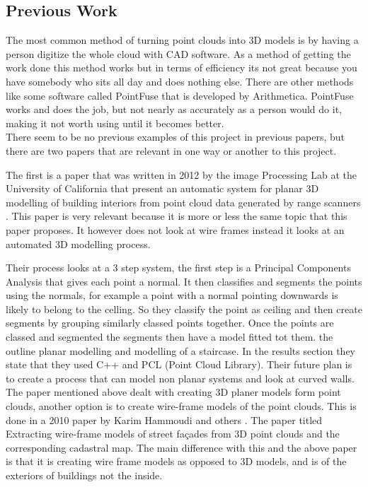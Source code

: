 

\subsection{Previous Work}

	The most common method of turning point clouds into 3D models is by having a person digitize the whole cloud with CAD software. As a method of getting the work done this method works but in terms of efficiency its not great because you have somebody who sits all day and does nothing else. There are other methods like some software called PointFuse that is developed by Arithmetica. PointFuse works and does the job, but not nearly as accurately as a person would do it, making it not worth using until it becomes better.\\

	
	There seem to be no previous examples of this project in previous papers, but there are two papers that are relevant in one way or another to this project.
	
	The first is a paper that was written in 2012 by the image Processing Lab at the University of California that present an automatic system for planar 3D modelling of building interiors from point cloud data generated by range scanners \citep{sanchez_planar_2012}. This paper is very relevant because it is more or less the same topic that this paper proposes. It however does not look at wire frames instead it looks at an automated 3D modelling process.
	
	Their process looks at a 3 step system, the first step is a Principal Components Analysis that gives each point a normal.
	It then classifies and segments the points using the normals, for example a point with a normal pointing downwards is likely to belong to the celling. So they classify the point as ceiling and then create segments by grouping similarly classed points together.
	Once the points are classed and segmented the segments then have a model fitted tot them. the outline planar modelling and modelling of a staircase. In the results section they state that they used C++ and PCL (Point Cloud Library). Their future plan is to create a process that can model non planar systems and look at curved walls.\\
	
	
	The paper mentioned above dealt with creating 3D planer models form point clouds, another option is to create wire-frame models of the point clouds. This is done in a 2010 paper by Karim Hammoudi and others \citep{valero_automatic_2012}. The paper titled Extracting wire-frame models of street fa\c{c}ades from 3D point clouds and the corresponding cadastral map. The main difference with this and the above paper is that it is creating wire frame models as opposed to 3D models, and is of the exteriors of buildings not the inside.
	
